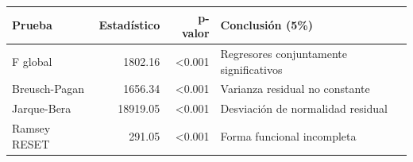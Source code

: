 \begin{tabular}{lrrl}
\toprule
Prueba & Estadístico & p-valor & Conclusión (5\%) \\
\midrule
F global & 1802.16 & <0.001 & Regresores conjuntamente significativos \\
Breusch-Pagan & 1656.34 & <0.001 & Varianza residual no constante \\
Jarque-Bera & 18919.05 & <0.001 & Desviación de normalidad residual \\
Ramsey RESET & 291.05 & <0.001 & Forma funcional incompleta \\
\bottomrule
\end{tabular}
